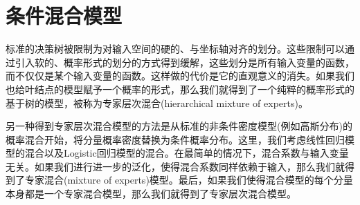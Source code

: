 \section{条件混合模型}
标准的决策树被限制为对输入空间的硬的、与坐标轴对齐的划分。这些限制可以通过引入软的、概率形式的划分的方式得到缓解，这些划分是所有输入变量的函数，而不仅仅是某个输入变量的函数。这样做的代价是它的直观意义的消失。如果我们也给叶结点的模型赋予一个概率的形式，那么我们就得到了一个纯粹的概率形式的基于树的模型，被称为专家层次混合(hierarchical mixture of experts)。

另一种得到专家层次混合模型的方法是从标准的非条件密度模型(例如高斯分布)的概率混合开始，将分量概率密度替换为条件概率分布。这里，我们考虑线性回归模型的混合以及Logistic回归模型的混合。在最简单的情况下，混合系数与输入变量无关。如果我们进行进一步的泛化，使得混合系数同样依赖于输入，那么我们就得到了专家混合(mixture of experts)模型。最后，如果我们使得混合模型的每个分量本身都是一个专家混合模型，那么我们就得到了专家层次混合模型。